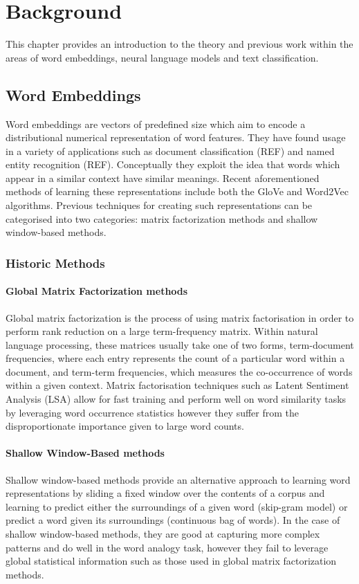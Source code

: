 \chapter{Background}
\label{chap:background}
This chapter provides an introduction to the theory and previous work within the areas of word embeddings, neural language models and text classification. 

\section{Word Embeddings}
Word embeddings are vectors of predefined size which aim to encode a distributional numerical representation of word features. They have found usage in a variety of applications such as document classification (REF) and named entity recognition (REF). Conceptually they exploit the idea that words which appear in a similar context have similar meanings. Recent aforementioned methods of learning these representations include both the GloVe and Word2Vec algorithms. Previous techniques for creating such representations can be categorised into two categories: matrix factorization methods and shallow window-based methods.
\subsection{Historic Methods}
\subsubsection{Global Matrix Factorization methods}
Global matrix factorization is the process of using matrix factorisation in order to perform rank reduction on a large term-frequency matrix. Within natural language processing, these matrices usually take one of two forms, term-document frequencies, where each entry represents the count of a particular word within a document, and term-term frequencies, which measures the co-occurrence of words within a given context. Matrix factorisation techniques such as Latent Sentiment Analysis (LSA) allow for fast training and perform well on word similarity tasks by leveraging word occurrence statistics however they suffer from the disproportionate importance given to large word counts.
\subsubsection{Shallow Window-Based methods}
Shallow window-based methods provide an alternative approach to learning word representations by sliding a fixed window over the contents of a corpus and learning to predict either the surroundings of a given word (skip-gram model) or predict a word given its surroundings (continuous bag of words). In the case of shallow window-based methods, they are good at capturing more complex patterns and do well in the word analogy task, however they fail to leverage global statistical information such as those used in global matrix factorization methods.
